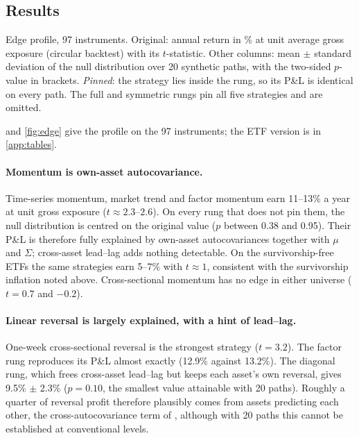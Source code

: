 \documentclass[11pt]{article}
\theoremstyle{definition}
\theoremstyle{remark}
\begin{document}
\subsection{Results}

\begin{table}[htbp]
\centering\small
\begin{adjustbox}{max width=\textwidth}\end{adjustbox}
\caption{Edge profile, 97 instruments. Original: annual return in \% at unit average gross exposure (circular backtest) with its $t$-statistic. Other columns: mean
$\pm$ standard deviation of the null distribution over 20 synthetic paths, with the two-sided $p$-value in brackets. \emph{Pinned}: the strategy lies inside the rung, so its
P\&L is identical on every path. The full and symmetric rungs pin all five strategies and are omitted.}
\label{tab:edge}
\end{table}

 and \cref{fig:edge} give the profile on the 97 instruments; the ETF version is in \cref{app:tables}.

\paragraph{Momentum is own-asset autocovariance.} Time-series momentum, market trend and factor momentum earn 11--13\% a year at unit gross exposure ($t\approx 2.3$--$2.6$).
On every rung that does not pin them, the null distribution is centred on the original value ($p$ between 0.38 and 0.95). Their P\&L is therefore fully explained by
own-asset autocovariances together with $\mu$ and $\Sigma$; cross-asset lead--lag adds nothing detectable. On the survivorship-free ETFs the same strategies earn
5--7\% with $t\approx 1$, consistent with the survivorship inflation noted above. Cross-sectional momentum has no edge in either universe ($t=0.7$ and $-0.2$).

\paragraph{Linear reversal is largely explained, with a hint of lead--lag.} One-week cross-sectional reversal is the strongest strategy ($t=3.2$). The factor rung reproduces
its P\&L almost exactly (12.9\% against 13.2\%). The diagonal rung, which frees cross-asset lead--lag but keeps each asset's own reversal, gives 9.5\% $\pm$ 2.3\%
($p=0.10$, the smallest value attainable with 20 paths). Roughly a quarter of reversal profit therefore plausibly comes from assets predicting each other, the
cross-autocovariance term of \citet{lo1990}, although with 20 paths this cannot be established at conventional levels.
\end{document}
